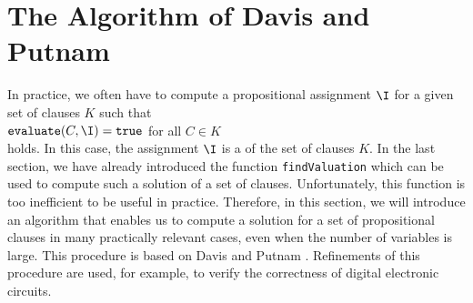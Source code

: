 
\section{The Algorithm of Davis and Putnam}
In practice, we often have to compute a propositional assignment $\I$ for a given set of clauses $K$ such that
\\[0.2cm]
\hspace*{1.3cm} $\texttt{evaluate}(C,\I) = \texttt{true}$ \quad for all $C \in K$ \\[0.2cm]
holds. In this case,  the assignment $\I$ is a  of the set of clauses $K$. In
the last section, we have already introduced the function \texttt{findValuation} which can be used to compute
such a solution of a set of clauses.  Unfortunately, this function is too inefficient to be useful in
practice.
Therefore, in this section, we will introduce an algorithm that enables us to compute a solution for a
set of propositional clauses in many practically relevant cases, even when the number of variables is
large. This procedure is based on Davis and Putnam \cite{davis:1960, davis:1962}. Refinements of this procedure
\cite{moskewicz:2001} are used, for example, to verify the correctness of digital electronic circuits. 

